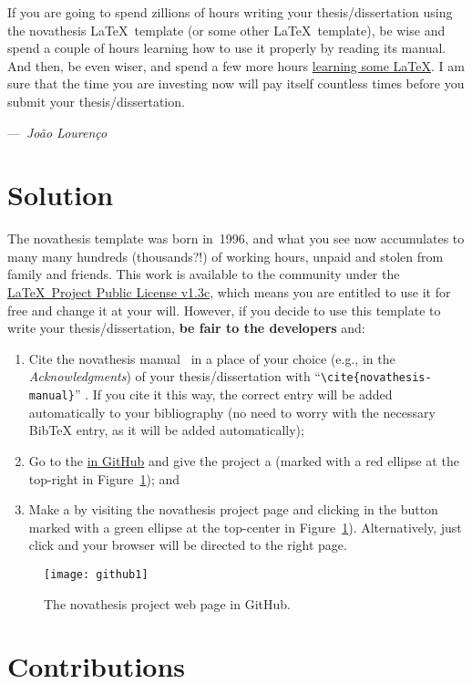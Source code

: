 \begin{tcolorbox}[colback=green!8]
  If you are going to spend zillions of hours writing your thesis/dissertation using the \gls{novathesis} \LaTeX\ template (or some other \LaTeX\ template), be wise and spend a couple of hours learning how to use it properly by reading its manual.  And then, be even wiser, and spend a few more hours \href{https://github.com/joaomlourenco/novathesis/wiki\#learning-latex}{learning some \LaTeX}.  I am sure that the time you are investing now will pay itself countless times before you submit your thesis/dissertation.\\\parbox{\linewidth}{\raggedleft---~\emph{João Lourenço}}
\end{tcolorbox}

\section{Solution}
\label{sec:solution}

\ntindex[Recognition]{}

The \gls{novathesis} template was born in~1996, and what you see now accumulates to many many hundreds (thousands?!) of working hours, unpaid and stolen from family and friends.  This work is available to the community under the \href{LaTeX project public license}{\LaTeX\ Project Public License v1.3c}, which means you are entitled to use it for free and change it at your will.  However, if you decide to use this template to write your thesis/dissertation, \textbf{be fair to the developers} and:
\begin{enumerate}
  \item {} Cite the \gls{novathesis} manual~\cite{novathesis-manual} in a place of your choice (e.g., in the \emph{Acknowledgments}) of your thesis/dissertation with “\verb!\cite{novathesis-manual}!” .  If you cite it this way, the correct entry will be added automatically to your bibliography (no need to worry with the necessary BibTeX entry, as it will be added automatically);
  \item Go to the
\href{https://github.com/joaomlourenco/novathesis}{ in GitHub} and give the project a  (marked with a red ellipse at the top-right in Figure~\ref{fig:github}); and
  \item Make a  by visiting the \gls{novathesis} project page and clicking in the button marked with a green ellipse at the top-center in Figure~\ref{fig:github}).  Alternatively, just click \href{https://www.paypal.com/donate/?hosted_button_id=8WA8FRVMB78W8}{} and your browser will be directed to the right page.
\end{enumerate}

\begin{figure}[htbp]
    \centering
    \texttt{[image: github1]}
    \caption{The \gls{novathesis} project web page in GitHub.}
    \label{fig:github}
\end{figure}

\section{Contributions}
\label{sec:contributions}
